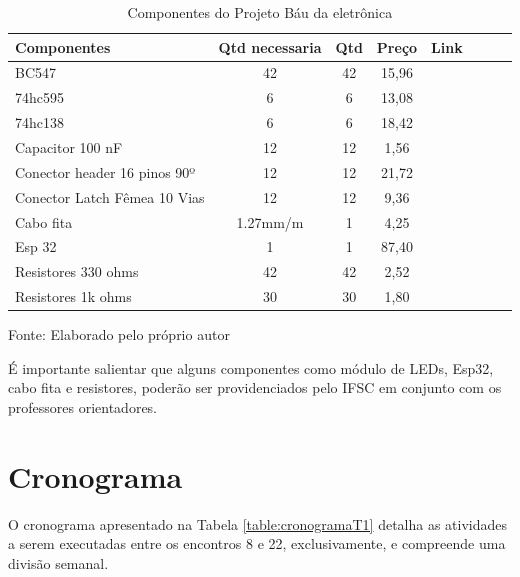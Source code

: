 \begin{table}[H]
	\centering\footnotesize
	\caption{ Componentes do Projeto Báu da eletrônica}	
	\begin{tabular}{p{5cm}S[table-format=0.2]S[table-format=0.2]S[table-format=0.2]S[table-format=0.2]S[table-format=0.2]S[table-format=0.2]S[table-format=0.2]}
		\toprule	
	Componentes & {Qtd necessaria} & {Qtd} & {Preço}  & {Link}
		\\
		\midrule
		BC547 & {42} & {42} & {15,96} &  \cite{BC547novo}\\
		74hc595 &  {6} & {6} & {13,08} &  \cite{74hc595novo}\\
		74hc138 &  {6} & {6} & {18,42} & \cite{74hc138novo}\\
		Capacitor 100 nF & {12} & {12} & {1,56} & \cite{Capacitor100nFnovo}\\
		Conector header 16 pinos 90º & {12} & {12}& {21,72} &  \cite{Conectorheader16Pinosnovo}\\
		Conector Latch Fêmea 10 Vias & {12} & {12} & {9,36} &  \cite{Conectorlatchfemeanovo}\\ 
		Cabo fita  & {1.27mm/m} & {1} & {4,25} &\cite{CaboFitanovo}\\ 
		Esp 32  & {1} & {1} & {87,40} &  \cite{Esp32novo}\\
		Resistores 330 ohms & {42} & {42} & {2,52} &  \cite{330novo}\\
		Resistores 1k ohms & {30} & {30} & {1,80} & \cite{1knovo}\\
		\bottomrule
	\end{tabular}
	\label{table:Componentes do projeto}
	\par Fonte: Elaborado pelo próprio autor
\end{table}

É importante salientar que alguns componentes como módulo de LEDs, Esp32, cabo fita e resistores, poderão ser providenciados pelo IFSC em conjunto com os professores orientadores. 

\chapter{Cronograma}

O cronograma apresentado na Tabela \ref{table:cronogramaT1} detalha as atividades a serem executadas entre os encontros 8 e 22, exclusivamente, e compreende uma divisão semanal.

